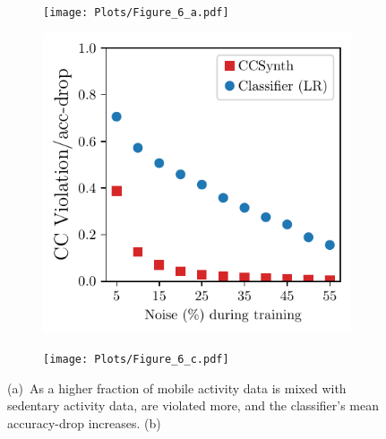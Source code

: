\begin{figure}[t!]
	\centering
	\vspace{-3mm}
	\hspace{-3mm}
	\begin{subfigure}[t]{0.16\textwidth}
		\centering
		\texttt{[image: Plots/Figure\_6\_a.pdf]}
	\vspace{-5mm}
	\caption{\phantom{randomrand}}
	\label{fig:har-ml-experiment}
	\end{subfigure}	
	\begin{subfigure}[t]{0.16\textwidth}
		\centering
		\includegraphics[width=\linewidth]{Plots/Figure_6_b.pdf}
	\vspace{-5mm}
	\caption{}
	\label{fig:har-ml-experiment-noise}
	\end{subfigure}	
	\begin{subfigure}[t]{0.16\textwidth}
		\centering
		\texttt{[image: Plots/Figure\_6\_c.pdf]}
	\vspace{-5mm}
	\caption{}
	\label{fig:gradual-drift-har}
	\end{subfigure}
	\vspace{-5mm}	
	\caption{(a)~As a higher fraction of mobile activity data is mixed with
sedentary activity data, \dis are violated more, and the classifier's
mean accuracy-drop increases. 
%
(b)~
}
\end{figure}
